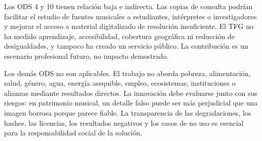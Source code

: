 Los ODS 4 y 10 tienen relación baja e indirecta. Las copias de consulta podrían facilitar el
estudio de fuentes musicales a estudiantes, intérpretes o investigadores y mejorar el acceso a
material digitalizado de resolución insuficiente. El TFG no ha medido
aprendizaje, accesibilidad, cobertura geográfica ni reducción de desigualdades, y tampoco ha creado
un servicio público. La contribución es un escenario profesional futuro, no
impacto demostrado.

Los demás ODS no son aplicables. El
trabajo no aborda pobreza, alimentación, salud, género, agua, energía asequible, empleo, ecosistemas,
instituciones o alianzas mediante resultados directos. La innovación debe evaluarse junto con
sus riesgos: en patrimonio musical, un detalle falso puede ser
más perjudicial que una imagen borrosa porque parece fiable. La transparencia de las degradaciones,
los hashes, las licencias, los resultados negativos y los casos de no uso es
esencial para la responsabilidad social de la solución.
